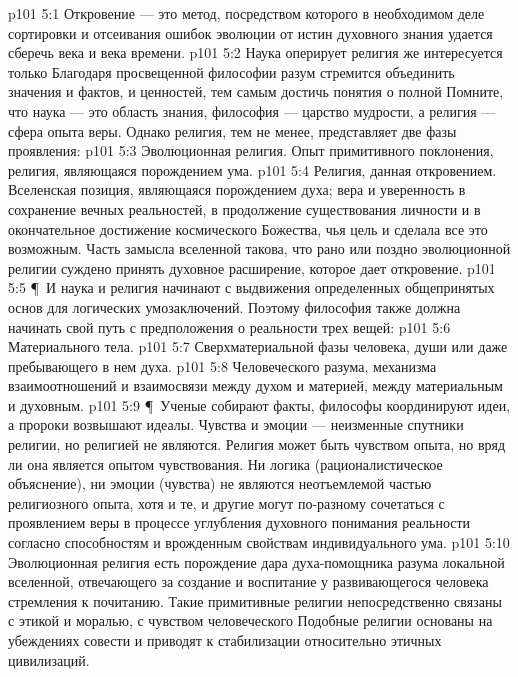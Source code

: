 \vs p101 5:1 Откровение --- это метод, посредством которого в необходимом деле сортировки и отсеивания ошибок эволюции от истин духовного знания удается сберечь века и века времени.
\vs p101 5:2 Наука оперирует  религия же интересуется только  Благодаря просвещенной философии разум стремится объединить значения и фактов, и ценностей, тем самым достичь понятия о полной  Помните, что наука --- это область знания, философия --- царство мудрости, а религия --- сфера опыта веры. Однако религия, тем не менее, представляет две фазы проявления:
\vs p101 5:3 \bibnobreakspace Эволюционная религия. Опыт примитивного поклонения, религия, являющаяся порождением ума.
\vs p101 5:4 \bibnobreakspace Религия, данная откровением. Вселенская позиция, являющаяся порождением духа; вера и уверенность в сохранение вечных реальностей, в продолжение существования личности и в окончательное достижение космического Божества, чья цель и сделала все это возможным. Часть замысла вселенной такова, что рано или поздно эволюционной религии суждено принять духовное расширение, которое дает откровение.
\vs p101 5:5 \P\ И наука и религия начинают с выдвижения определенных общепринятых основ для логических умозаключений. Поэтому философия также должна начинать свой путь с предположения о реальности трех вещей:
\vs p101 5:6 \bibnobreakspace Материального тела.
\vs p101 5:7 \bibnobreakspace Сверхматериальной фазы человека, души или даже пребывающего в нем духа.
\vs p101 5:8 \bibnobreakspace Человеческого разума, механизма взаимоотношений и взаимосвязи между духом и материей, между материальным и духовным.
\vs p101 5:9 \P\ Ученые собирают факты, философы координируют идеи, а пророки возвышают идеалы. Чувства и эмоции --- неизменные спутники религии, но религией не являются. Религия может быть чувством опыта, но вряд ли она является опытом чувствования. Ни логика (рационалистическое объяснение), ни эмоции (чувства) не являются неотъемлемой частью религиозного опыта, хотя и те, и другие могут по\hyp{}разному сочетаться с проявлением веры в процессе углубления духовного понимания реальности согласно способностям и врожденным свойствам индивидуального ума.
\vs p101 5:10 Эволюционная религия есть порождение дара духа\hyp{}помощника разума локальной вселенной, отвечающего за создание и воспитание у развивающегося человека стремления к почитанию. Такие примитивные религии непосредственно связаны с этикой и моралью, с чувством человеческого  Подобные религии основаны на убеждениях совести и приводят к стабилизации относительно этичных цивилизаций.
